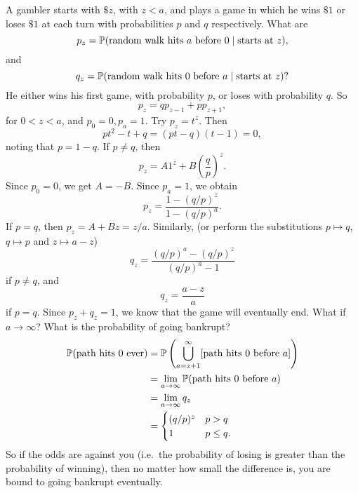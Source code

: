 \begin{note}
  \begin{field}
    \begin{eg}
      A gambler starts with $\$z$, with $z < a$, and plays a game in which he wins $\$1$ or loses $\$ 1$ at each turn with probabilities $p$ and $q$ respectively. What are
      \[
        p_z = \P(\text{random walk hits $a$ before } 0 \mid \text{starts at } z),
      \]
      and
      \[
        q_z = \P(\text{random walk hits 0 before }a \mid \text{starts at }z)?
      \]
      He either wins his first game, with probability $p$, or loses with probability $q$. So
      \[
        p_z = qp_{z - 1} + pp_{z + 1},
      \]
      for $0 < z < a$, and $p_0 = 0, p_a = 1$.
      Try $p_z = t^z$. Then
      \[
        pt^2 - t + q = (pt - q)(t - 1) = 0,
      \]
      noting that $p = 1 - q$. If $p \not = q$, then
      \[
        p_z = A1^z + B\left(\frac{q}{p}\right)^z.
      \]
      Since $p_0 = 0$, we get $A = -B$. Since $p_a = 1$, we obtain
      \[
        p_z = \frac{1 - (q/p)^z}{1 - (q/p)^a}.
      \]
      If $p = q$, then $p_z = A + Bz = z/a$.
      Similarly, (or perform the substitutions $p\mapsto q$, $q\mapsto p$ and $z \mapsto a - z$)
      \[
        q_z = \frac{(q/p)^a - (q/p)^z}{(q / p)^a - 1}
      \]
      if $p\not = q$, and
      \[
        q_z = \frac{a - z}{a}
      \]
      if $p = q$. Since $p_z + q_z = 1$, we know that the game will eventually end.
      What if $a\to \infty$? What is the probability of going bankrupt?
      \begin{align*}
        \P(\text{path hits 0 ever}) &= \P\left(\bigcup_{a = z+1}^\infty [\text{path hits 0 before }a]\right)\\
        &= \lim_{a\to \infty}\P(\text{path hits 0 before }a)\\
        &= \lim_{a\to \infty}q_z\\
        &= \begin{cases}
          (q/p)^z & p > q\\
          1 & p \leq q.
        \end{cases}
      \end{align*}
      So if the odds are against you (i.e.\ the probability of losing is greater than the probability of winning), then no matter how small the difference is, you are bound to going bankrupt eventually.
    \end{eg}
  \end{field}
  \begin{field}

\end{field}
\end{note}
